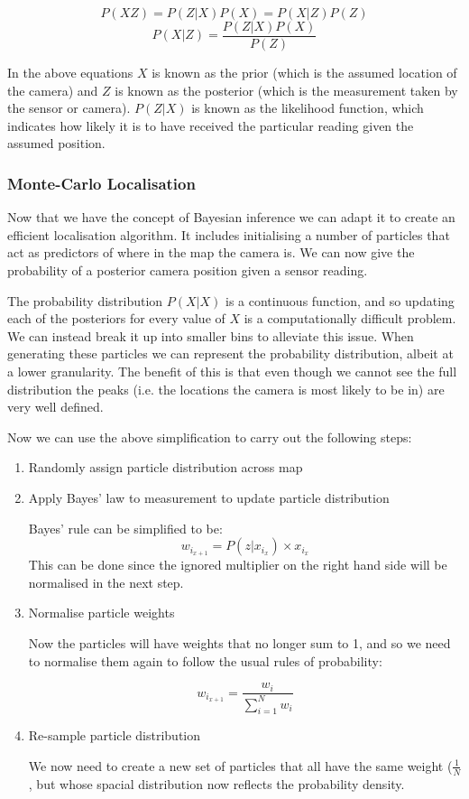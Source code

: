 $$ P(XZ) = P(Z|X)P(X) = P(X|Z)P(Z) $$
$$ P(X|Z) = \frac{P(Z|X)P(X)}{P(Z)}$$

In the above equations $ X $ is known as the prior (which is the assumed location of the camera) and $ Z $ is known as the posterior (which is the measurement taken by the sensor or camera). $P(Z|X) $ is known as the likelihood function, which indicates how likely it is to have received the particular reading given the assumed position.

\subsubsection{Monte-Carlo Localisation}

Now that we have the concept of Bayesian inference we can adapt it to create an efficient localisation algorithm. It includes initialising a number of particles that act as predictors of where in the map the camera is. We can now give the probability of a posterior camera position given a sensor reading.

The probability distribution $ P(X|X) $ is a continuous function, and so updating each of the posteriors for every value of $ X $ is a computationally difficult problem. We can instead break it up into smaller bins to alleviate this issue. When generating these particles we can represent the probability distribution, albeit at a lower granularity. The benefit of this is that even though we cannot see the full distribution the peaks (i.e. the locations the camera is most likely to be in) are very well defined.

Now we can use the above simplification to carry out the following steps:

\begin{enumerate}
      \item Randomly assign particle distribution across map
      \item Apply Bayes' law to measurement to update particle distribution

            Bayes' rule can be simplified to be:
            $$ w_{i_{x+1}} = P(z|x_{i_x}) \times x_{i_x} $$
            This can be done since the ignored multiplier on the right hand side will be normalised in the next step.
      \item Normalise particle weights

            Now the particles will have weights that no longer sum to 1, and so we need to normalise them again to follow the usual rules of probability:

            $$ w_{i_{x+1}} = \frac{w_i}{\sum^N_{i=1}w_i} $$
      \item Re-sample particle distribution

            We now need to create a new set of particles that all have the same weight ($ \frac{1}{N} $, but whose spacial distribution now reflects the probability density.
\end{enumerate}

